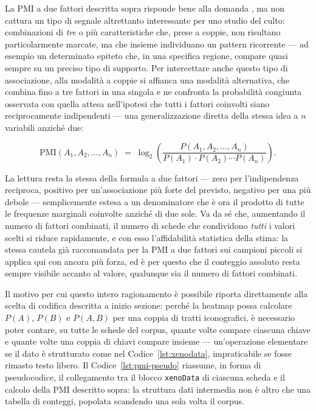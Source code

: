 \documentclass[11pt,a4paper]{article}
\begin{document}
La PMI a due fattori descritta sopra risponde bene alla domanda
, ma non
cattura un tipo di segnale altrettanto interessante per uno studio del
culto: combinazioni di \emph{tre} o più caratteristiche che, prese a
coppie, non risultano particolarmente marcate, ma che insieme
individuano un pattern ricorrente --- ad esempio un determinato epiteto
che, in una specifica regione, compare quasi sempre su un preciso tipo
di supporto. Per intercettare anche questo tipo di associazione, alla
modalità a coppie si affianca una modalità alternativa, che combina fino
a tre fattori in una singola  e ne confronta la
probabilità congiunta osservata con quella attesa nell'ipotesi che tutti
i fattori coinvolti siano reciprocamente indipendenti --- una
generalizzazione diretta della stessa idea a $n$ variabili anziché due:

\[
  \mathrm{PMI}(A_1, A_2, \ldots, A_n) \;=\; \log_2 \left(
  \frac{P(A_1, A_2, \ldots, A_n)}{P(A_1)\cdot P(A_2)\cdots P(A_n)}
  \right).
\]

La lettura resta la stessa della formula a due fattori --- zero
per l'indipendenza reciproca, positivo per un'associazione più forte del
previsto, negativo per una più debole --- semplicemente estesa a un
denominatore che è ora il prodotto di tutte le frequenze marginali
coinvolte anziché di due sole. Va da sé che, aumentando il numero di
fattori combinati, il numero di schede che condividono \emph{tutti} i
valori scelti si riduce rapidamente, e con esso l'affidabilità
statistica della stima: la stessa cautela già raccomandata per la PMI a
due fattori sui campioni piccoli si applica qui con ancora più forza, ed
è per questo che il conteggio assoluto resta sempre visibile accanto al
valore, qualunque sia il numero di fattori combinati.

Il motivo per cui questo intero ragionamento è possibile riporta
direttamente alla scelta di codifica descritta a inizio sezione: perché
la heatmap possa calcolare $P(A)$, $P(B)$ e $P(A,B)$ per una coppia di
tratti iconografici, è necessario poter contare, su tutte le schede del
corpus, quante volte compare ciascuna chiave e quante volte una coppia
di chiavi compare insieme --- un'operazione elementare se il dato è
strutturato come nel Codice~\ref{lst:xenodata}, impraticabile se fosse
rimasto testo libero. Il Codice~\ref{lst:pmi-pseudo} riassume, in forma
di pseudocodice, il collegamento tra il blocco \texttt{xenoData} di
ciascuna scheda e il calcolo della PMI descritto sopra: la struttura
dati intermedia non è altro che una tabella di conteggi, popolata
scandendo una sola volta il corpus.
\end{document}
